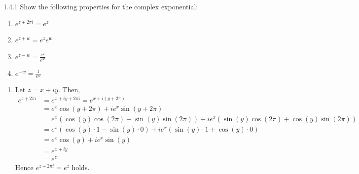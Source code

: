 \documentclass[12pt]{article}
\begin{document}


\begin{problem}{1.4.1}
    Show the following properties for the complex exponential: 
    \begin{enumerate}
        \item $e^{z+2\pi i} = e^z$
        \item $e^{z+w} = e^ze^w$
        \item $e^{z-w} = \frac{e^z}{e^w}$
        \item $e^{-w} = \frac{1}{e^w}$
    \end{enumerate}
\end{problem}

\begin{solution}
    \bbni
    \begin{enumerate}
        \item Let $z = x + iy$. Then, 
        \begin{align*}
            e^{z+2\pi i} &= e^{x + iy + 2 \pi i} = e^{x + i(y + 2\pi)} \\ 
            &= e^x \cos(y+ 2\pi) + ie^x \sin (y + 2\pi) \\
            &=e^x (\cos(y)\cos(2\pi) - \sin(y)\sin(2\pi)) + ie^x (\sin(y)\cos(2\pi) + \cos(y)\sin(2\pi)) \\ 
            &=e^x (\cos(y) \cdot 1 - \sin(y) \cdot 0) + ie^x (\sin(y)\cdot 1 + \cos(y) \cdot 0) \\
            &= e^x\cos(y) + ie^x\sin(y) \\ 
            &= e^{x+iy} \\ 
            &= e^z
        \end{align*}
        Hence $e^{z + 2\pi i} = e^z$ holds. 


\end{enumerate}
\end{solution}
\end{document}
